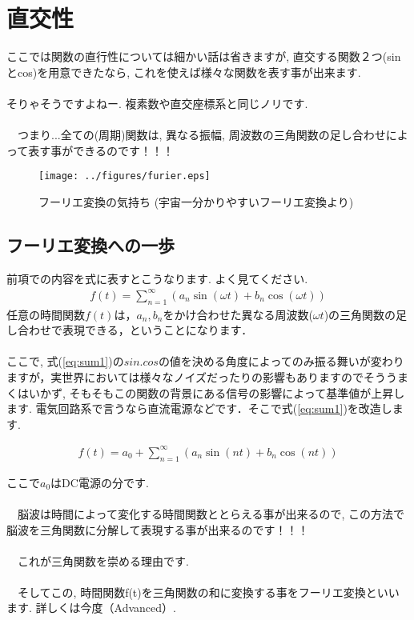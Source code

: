 \documentclass[11pt,a4paper]{ujreport}
\begin{document}
\section{直交性}
ここでは関数の直行性については細かい話は省きますが, 直交する関数２つ(sinとcos)を用意できたなら, これを使えば様々な関数を表す事が出来ます.\\
\\
そりゃそうですよねー. 複素数や直交座標系と同じノリです.\\
\\
　つまり...全ての(周期)関数は, 異なる振幅, 周波数の三角関数の足し合わせによって表す事ができるのです！！！\\

\begin{figure}[H]
\label{im:furier}
  \centering
  \texttt{[image: ../figures/furier.eps]}
  \caption{フーリエ変換の気持ち (宇宙一分かりやすいフーリエ変換より)}
\end{figure}

\subsection{フーリエ変換への一歩}
前項での内容を式に表すとこうなります. よく見てください.
\begin{eqnarray}
f(t) = \sum_{n=1}^\infty ({a_n \sin(\omega t) + b_n\cos(\omega t)}
\label{eq:sum1})
\end{eqnarray}
任意の時間関数$f(t)$は，$a_n,b_n$をかけ合わせた異なる周波数($\omega t$)の三角関数の足し合わせで表現できる，ということになります．\\
\\

ここで, 式(\ref{eq:sum1})の$sin. cos$の値を決める角度によってのみ振る舞いが変わりますが，実世界においては様々なノイズだったりの影響もありますのでそううまくはいかず, そもそもこの関数の背景にある信号の影響によって基準値が上昇します. 電気回路系で言うなら直流電源などです．そこで式(\ref{eq:sum1})を改造します.

\begin{eqnarray}
f(t) = a_0 + \sum_{n=1}^\infty ({a_n \sin(nt) + b_n\cos(nt)}
\label{eq:fixed_sum})
\end{eqnarray}

ここで$a_0$はDC電源の分です.\\
\\
　脳波は時間によって変化する時間関数ととらえる事が出来るので, この方法で脳波を三角関数に分解して表現する事が出来るのです！！！\\
\\
　これが三角関数を崇める理由です.\\
\\
　そしてこの, 時間関数f(t)を三角関数の和に変換する事をフーリエ変換といいます. 詳しくは今度（Advanced）.\\
\end{document}

